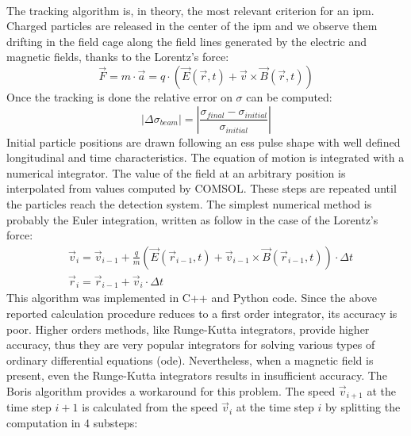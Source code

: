 \begin{refsection}
  \paragraph{}
  The tracking algorithm is, in theory, the most relevant criterion for an \acrshort{ipm}. Charged particles are released in the center of the \acrshort{ipm} and we observe them drifting in the field cage along the field lines generated by the electric and magnetic fields, thanks to the Lorentz’s force:
  \begin{equation}
    \vec{F} = m \cdot \vec{a} = q \cdot (\vec{E}(\vec{r},t) + \vec{v} \times \vec{B}(\vec{r},t))
  \end{equation}
  Once the tracking is done the relative error on $\sigma$ can be computed:
  \begin{equation}
    \left| \Delta \sigma_{beam} \right| = \left|\frac{\sigma_{final} - \sigma_{initial}}{\sigma_{initial}} \right|
  \end{equation}
  Initial particle positions are drawn following an \acrshort{ess} pulse shape with well defined longitudinal and time characteristics. The equation of motion is integrated with a numerical integrator. The value of the field at an arbitrary position is interpolated from values computed by COMSOL. These steps are repeated until the particles reach the detection system. The simplest numerical method is probably the Euler integration, written as follow in the case of the Lorentz’s force:
  \begin{align}
     & \vec{v}_{i} = \vec{v}_{i-1} + \frac{q}{m}(\vec{E}(\vec{r}_{i-1},t) + \vec{v}_{i-1} \times \vec{B}(\vec{r}_{i-1},t)) \cdot \Delta t \\
     & \vec{r}_{i} = \vec{r}_{i-1} + \vec{v}_{i} \cdot \Delta t
  \end{align}
  This algorithm was implemented in C++ and Python code. Since the above reported calculation procedure reduces to a first order integrator, its accuracy is poor. Higher orders methods, like Runge-Kutta integrators, provide higher accuracy, thus they are very popular integrators for solving various types of ordinary differential equations (\acrshort{ode}). Nevertheless, when a magnetic field is present, even the Runge-Kutta integrators results in insufficient accuracy.
  The Boris algorithm \cite{Boris1970} provides a workaround for this problem. The speed $\vec{v}_{i+1}$ at the time step $i+1$ is calculated from the speed $\vec{v}_{i}$ at the time step $i$ by splitting the computation in 4 substeps:
  \begin{align}

\end{align}
\end{refsection}
